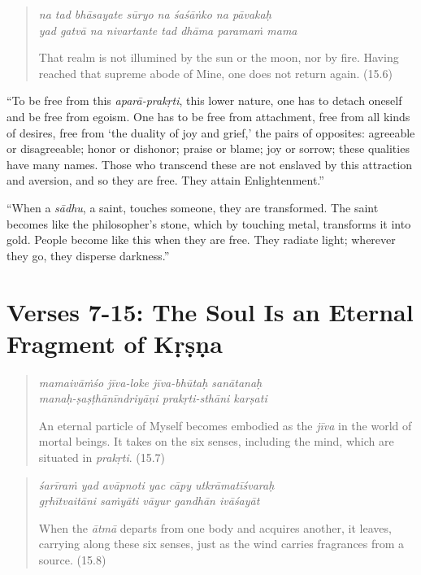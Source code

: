 \documentclass[12pt, twoside, openright]{memoir}
\begin{document}
\par
\begin{verse}
\textit{na tad bhāsayate sūryo na śaśāṅko na pāvakaḥ} \\
\textit{yad gatvā na nivartante tad dhāma paramaṁ mama}

\noindent That realm is not illumined by the sun or the moon, nor by fire. Having reached that supreme abode of Mine, one does not return again. (15.6)
\end{verse}
\par


\enquote{To be free from this \textit{aparā-prakṛti}, this lower nature, one has to detach oneself and be free from egoism. One has to be free from attachment, free from all kinds of desires, free from \enquote{the duality of joy and grief,} the pairs of opposites: agreeable or disagreeable; honor or dishonor; praise or blame; joy or sorrow; these qualities have many names. Those who transcend these are not enslaved by this attraction and aversion, and so they are free. They attain Enlightenment.}

\enquote{When a \textit{sādhu}, a saint, touches someone, they are transformed. The saint becomes like the philosopher’s stone, which by touching metal, transforms it into gold. People become like this when they are free. They radiate light; wherever they go, they disperse darkness.}

\section{Verses 7-15: The Soul Is an Eternal Fragment of Kṛṣṇa}\label{sec-verses-7-15-the-soul-is-an-eternal-fragment-of-krsna}


\par
\begin{verse}
\textit{mamaivāṁśo jīva-loke jīva-bhūtaḥ sanātanaḥ} \\
\textit{manaḥ-ṣaṣṭhānīndriyāṇi prakṛti-sthāni karṣati}

\noindent An eternal particle of Myself becomes embodied as the \textit{jīva} in the world of mortal beings. It takes on the six senses, including the mind, which are situated in \textit{prakṛti}. (15.7)
\end{verse}
\par



\par
\begin{verse}
\textit{śarīraṁ yad avāpnoti yac cāpy utkrāmatīśvaraḥ} \\
\textit{gṛhītvaitāni saṁyāti vāyur gandhān ivāśayāt}

\noindent When the \textit{ātmā} departs from one body and acquires another, it leaves, carrying along these six senses, just as the wind carries fragrances from a source. (15.8)
\end{verse}
\par
\end{document}
